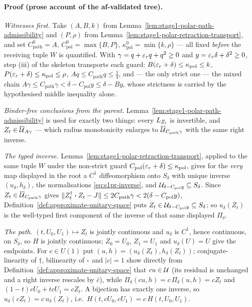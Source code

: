 \paragraph{Proof (prose account of the af-validated tree).}
\emph{Witnesses first.} Take $(A,B,k)$ from Lemma~\ref{lem:stage1-polar-path-admissibility}
and $(P,\rho)$ from Lemma~\ref{lem:stage1-polar-retraction-transport}, and set
$C^{0}_{\mathrm{path}}=A$, $C^{0}_{\mathrm{pol}}=\max\{B,P\}$,
$\kappa^{0}_{\mathrm{pol}}=\min\{k,\rho\}$ --- all fixed \emph{before} the receiving tuple
$W$ is quantified. With $\gamma=q+\varepsilon_rq+q^{2}\ge0$ and $y=\varepsilon_r\delta+\delta^{2}\ge0$,
step (iii) of the skeleton transports each guard: $B(\varepsilon_r+\delta)\le\kappa_{\mathrm{pol}}\le k$,
$P(\varepsilon_r+\delta)\le\kappa_{\mathrm{pol}}\le\rho$, $Aq\le C_{\mathrm{path}}q\le\tfrac14$,
and --- the only strict one --- the mixed chain
$A\gamma\le C_{\mathrm{path}}\gamma<\delta-C_{\mathrm{pol}}y\le\delta-By$, whose strictness
is carried by the hypothesised middle inequality alone.

\emph{Binder-free conclusions from the parent.}
Lemma~\ref{lem:stage1-polar-path-admissibility} is used for exactly two things: every
$L_{Z_t}$ is invertible, and $Z_t\in\overline{\mathcal U}_{A\gamma}$ --- which radius monotonicity
enlarges to $\overline{\mathcal U}_{C_{\mathrm{path}}\gamma}$ with the same right inverse.

\emph{The typed inverse.} Lemma~\ref{lem:stage1-polar-retraction-transport}, applied to the
same tuple $W$ under the non-strict guard $C_{\mathrm{pol}}(\varepsilon_r+\delta)\le\kappa_{\mathrm{pol}}$,
gives for the \emph{very} map displayed in the root a $C^{1}$ diffeomorphism onto
$S_\delta$ with unique inverse $(u_\delta,h_\delta)$, the normalisations
\eqref{eq:s1pr-inverse}, and $\mathcal U_{\delta-C_{\mathrm{pol}}y}\subseteq S_\delta$. Since
$Z_t\in\overline{\mathcal U}_{C_{\mathrm{path}}\gamma}$ gives $\lVert Z_t^{\dagger}\mathbin{\bm{\cdot}} Z_t-J\rVert\le2C_{\mathrm{path}}\gamma
<2(\delta-C_{\mathrm{pol}}y)$, Definition~\ref{def:approximate-unitary-space} puts
$Z_t\in\mathcal U_{\delta-C_{\mathrm{pol}}y}\subseteq S_\delta$; so $u_\delta(Z_t)$ is the
well-typed first component of the inverse of that same displayed $\Pi_\delta$.

\emph{The path.} $(t,U_0,U_1)\mapsto Z_t$ is jointly continuous and $u_\delta$ is $C^{1}$,
hence continuous, on $S_\delta$, so $H$ is jointly continuous; $Z_0=U_0$, $Z_1=U_1$ and
$u_\delta(U)=U$ give the endpoints. For $c\in U(1)$ put $(u,h)=(u_\delta(Z_t),h_\delta(Z_t))$;
conjugate-linearity of $\dagger$, bilinearity of $\mathbin{\bm{\cdot}}$ and $|c|=1$ show directly from
Definition~\ref{def:approximate-unitary-space} that $cu\in\mathcal U$ (its residual is unchanged
and a right inverse rescales by $\bar c$), while $\Pi_\delta(cu,h)=c\,\Pi_\delta(u,h)=cZ_t$
and $(1-t)cU_0+tcU_1=cZ_t$. A bijection has exactly one inverse, so
$u_\delta(cZ_t)=c\,u_\delta(Z_t)$, i.e.\ $H(t,cU_0,cU_1)=c\,H(t,U_0,U_1)$.

